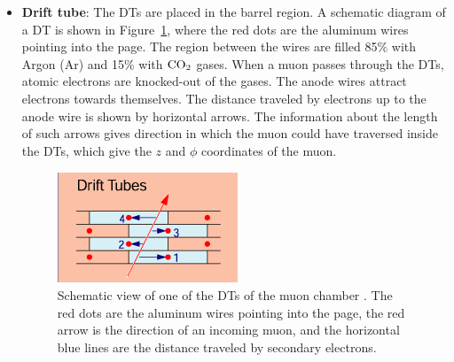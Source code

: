 \begin{itemize}[leftmargin=*]
\item \textbf{Drift tube}: The DTs are placed in the barrel region. 
A schematic diagram of a DT is shown in Figure~\ref{fig:cms_dt}, where the 
red dots are the aluminum wires pointing into the page. The region between the wires 
are filled 85\% with Argon (Ar) and 15\% with $\rm{CO}_2$ gases. When a muon passes through 
the DTs, atomic electrons are knocked-out of the gases. The anode wires attract electrons
towards themselves. The distance traveled by electrons up to the anode wire is shown
by horizontal arrows. The information about the length of such arrows gives direction
in which the muon could have traversed inside the DTs, which give the $z$ and $\phi$ 
coordinates of the muon.
\begin{figure}
\centering
\includegraphics[width=0.50\linewidth]{Experiment/CMS/Image/DT.png}
\caption{Schematic view of one of the DTs of the muon chamber \cite{Collaboration_2008_CMS}. 
	The red dots are the aluminum wires pointing into the page, the red arrow is the
	direction of an incoming muon, and the horizontal blue lines are the 
	distance traveled by secondary electrons.}
\label{fig:cms_dt}
\end{figure}


\end{itemize}
